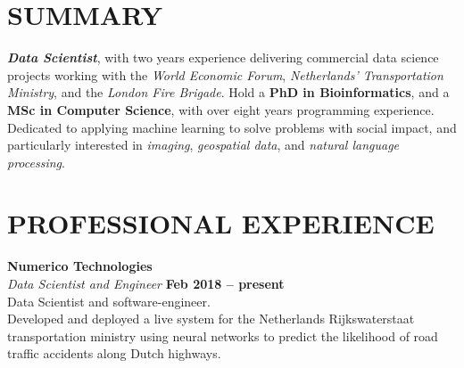 \documentclass[margin,line]{resume}
\begin{document}
\begin{resume}

    \vspace{-3mm}

    \section{\mysidestyle \textbf{\large{S}\small{UMMARY}}}

    \textbf{\textsl{Data Scientist}}, with two years experience delivering commercial data science projects working with the \textsl{World Economic Forum}, \textsl{Netherlands' Transportation Ministry}, and the \textsl{London Fire Brigade}.  Hold a \textbf{PhD in Bioinformatics}, and a \textbf{MSc in Computer Science}, with over eight years programming experience.  Dedicated to applying machine learning to solve problems with social impact, and particularly interested in \textsl{imaging}, \textsl{geospatial data}, and \textsl{natural language processing}.

    \vspace{-1mm}

\sectionline

    \section{\mysidestyle \textbf{\large{P}\small{ROFESSIONAL} \large{E}\small{XPERIENCE}}}

    \textbf{\listing Numerico Technologies} \vspace{2mm}\\\vspace{1mm}%
    \textsl{Data Scientist and Engineer} \hfill \textbf{Feb 2018 -- present}\\
    Data Scientist and software-engineer. \\
	 Developed and deployed a live system for the Netherlands Rijkswaterstaat transportation ministry using neural networks to predict the likelihood of road traffic accidents along Dutch highways.


\end{resume}
\end{document}
